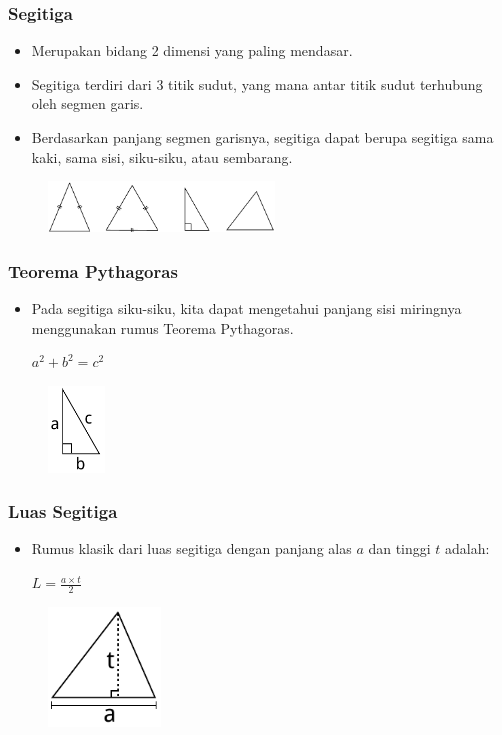 \begin{frame}
\frametitle{Segitiga}
\begin{itemize}
  \item Merupakan bidang 2 dimensi yang paling mendasar.
  \item Segitiga terdiri dari 3 titik sudut, yang mana antar titik sudut terhubung oleh segmen garis.
  \item Berdasarkan panjang segmen garisnya, segitiga dapat berupa segitiga sama kaki, sama sisi, siku-siku, atau sembarang.
\end{itemize}
\begin{figure}
  \includegraphics[width=6cm]{asset/triangles.pdf}
\end{figure}
\end{frame}

\begin{frame}
\frametitle{Teorema Pythagoras}
\begin{itemize}
  \item Pada segitiga siku-siku, kita dapat mengetahui panjang sisi miringnya menggunakan rumus Teorema Pythagoras.
  
  \(a^2 + b^2 = c^2\)
\end{itemize}
\begin{figure}
  \includegraphics[width=1.5cm]{asset/pythagoras.pdf}
\end{figure}
\end{frame}

\begin{frame}
\frametitle{Luas Segitiga}
\begin{itemize}
  \item Rumus klasik dari luas segitiga dengan panjang alas $a$ dan tinggi $t$ adalah:\newline
  
  \(\displaystyle L = \frac{a \times t}{2}\)
\end{itemize}
\begin{figure}
  \includegraphics[width=3cm]{asset/triangle-area.pdf}
\end{figure}
\end{frame}

